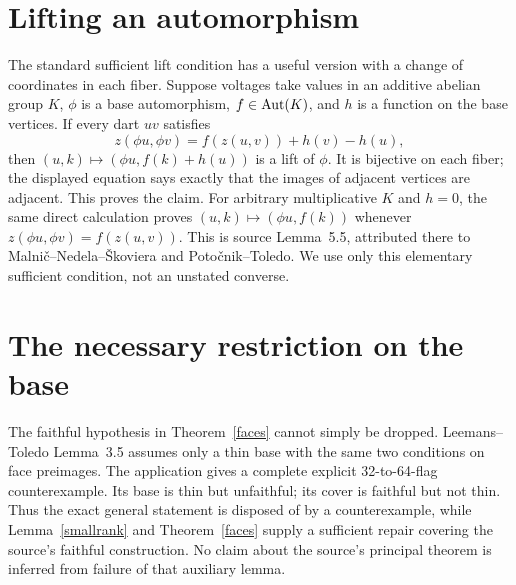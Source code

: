 \documentclass[a4paper,11pt]{article}
\begin{document}
\section{Lifting an automorphism}
The standard sufficient lift condition has a useful version with a change
of coordinates in each fiber. Suppose voltages take values in an additive
abelian group $K$, $\phi$ is a base automorphism, $f\in\operatorname{Aut}(K)$, and
$h$ is a function on the base vertices. If every dart $u v$ satisfies
\[
z(\phi u,\phi v)=f(z(u,v))+h(v)-h(u),
\]
then $(u,k)\mapsto(\phi u,f(k)+h(u))$ is a lift of $\phi$.
It is bijective on each fiber; the displayed equation says exactly that
the images of adjacent vertices are adjacent. This proves the claim.
For arbitrary multiplicative $K$ and $h=0$, the same direct calculation
proves $(u,k)\mapsto(\phi u,f(k))$ whenever
$z(\phi u,\phi v)=f(z(u,v))$. This is source Lemma~5.5, attributed there
to Malni\v c--Nedela--\v Skoviera and Poto\v cnik--Toledo. We use only
this elementary sufficient condition, not an unstated converse.

\section{The necessary restriction on the base}
The faithful hypothesis in Theorem~\ref{faces} cannot simply be dropped.
Leemans--Toledo Lemma~3.5 assumes only a thin base with the same two
conditions on face preimages. The application gives a complete explicit
32-to-64-flag counterexample. Its base is thin but unfaithful; its cover
is faithful but not thin. Thus the exact general statement is disposed
of by a counterexample, while Lemma~\ref{smallrank} and
Theorem~\ref{faces} supply a sufficient repair covering the source's
faithful construction. No claim about the source's principal theorem
is inferred from failure of that auxiliary lemma.
\end{document}
